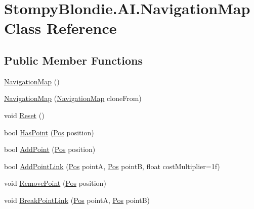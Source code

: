 \hypertarget{class_stompy_blondie_1_1_a_i_1_1_navigation_map}{}\section{Stompy\+Blondie.\+A\+I.\+Navigation\+Map Class Reference}
\label{class_stompy_blondie_1_1_a_i_1_1_navigation_map}
\subsection*{Public Member Functions}
\begin{DoxyCompactItemize}
\item 
\mbox{\hyperlink{class_stompy_blondie_1_1_a_i_1_1_navigation_map_a0e5a432873f28ea782cb925c36610815}{Navigation\+Map}} ()
\item 
\mbox{\hyperlink{class_stompy_blondie_1_1_a_i_1_1_navigation_map_a62f3061cd8d46288f7fee1e6c80a1b9b}{Navigation\+Map}} (\mbox{\hyperlink{class_stompy_blondie_1_1_a_i_1_1_navigation_map}{Navigation\+Map}} clone\+From)
\item 
void \mbox{\hyperlink{class_stompy_blondie_1_1_a_i_1_1_navigation_map_a5922bcfcb17953ec21c868b260b41953}{Reset}} ()
\item 
bool \mbox{\hyperlink{class_stompy_blondie_1_1_a_i_1_1_navigation_map_a10c2593b8a9fbaf0ac01095f40c12dc8}{Has\+Point}} (\mbox{\hyperlink{struct_stompy_blondie_1_1_common_1_1_types_1_1_pos}{Pos}} position)
\item 
bool \mbox{\hyperlink{class_stompy_blondie_1_1_a_i_1_1_navigation_map_af6d4dcdcca40f142146538ed2fe7c21f}{Add\+Point}} (\mbox{\hyperlink{struct_stompy_blondie_1_1_common_1_1_types_1_1_pos}{Pos}} position)
\item 
bool \mbox{\hyperlink{class_stompy_blondie_1_1_a_i_1_1_navigation_map_a2658ca4206a19449243d4a16393ebb85}{Add\+Point\+Link}} (\mbox{\hyperlink{struct_stompy_blondie_1_1_common_1_1_types_1_1_pos}{Pos}} pointA, \mbox{\hyperlink{struct_stompy_blondie_1_1_common_1_1_types_1_1_pos}{Pos}} pointB, float cost\+Multiplier=1f)
\item 
void \mbox{\hyperlink{class_stompy_blondie_1_1_a_i_1_1_navigation_map_ae13b0ae98c3b2309b0349439bf58ed13}{Remove\+Point}} (\mbox{\hyperlink{struct_stompy_blondie_1_1_common_1_1_types_1_1_pos}{Pos}} position)
\item 
void \mbox{\hyperlink{class_stompy_blondie_1_1_a_i_1_1_navigation_map_aa49f9eb7f626fad4bbbb9ddd411fa41d}{Break\+Point\+Link}} (\mbox{\hyperlink{struct_stompy_blondie_1_1_common_1_1_types_1_1_pos}{Pos}} pointA, \mbox{\hyperlink{struct_stompy_blondie_1_1_common_1_1_types_1_1_pos}{Pos}} pointB)

\end{DoxyCompactItemize}
